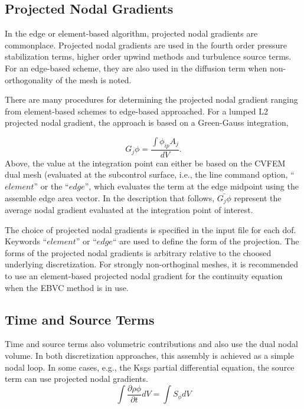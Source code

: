 \subsection{Projected Nodal Gradients}
In the edge or element-based algorithm, projected nodal gradients
are commonplace. Projected nodal gradients are used in the fourth 
order pressure stabilization terms, higher order upwind methods and
turbulence source terms. For an edge-based scheme, they are also used
in the diffusion term when non-orthogonality of the mesh is noted.

There are many procedures for determining the projected 
nodal gradient ranging from element-based schemes to
edge-based approached. For a lumped L2 projected nodal gradient,
the approach is based on a Green-Gauss integration,

\begin{equation}
G_j \phi = \frac{\int \phi_{ip} A_j}{dV}.
\label{greenGauss}
\end{equation}
Above, the value at the integration point can either be
based on the CVFEM dual mesh (evaluated at the subcontrol
surface, i.e., the line command option, ``$element$'' or the ``$edge$'', which 
evaluates the term at the edge midpoint using the assemble edge area vector. 
In the description that follows, $\bar{G_j \phi}$
represent the average nodal gradient evaluated at the integration
point of interest.

The choice of projected nodal gradients is specified in the input file for each dof.
Keywords ``$element$'' or ``$edge$`` are used to define the form of the projection. The
forms of the projected nodal gradients is arbitrary relative to the choosed underlying
discretization. For strongly non-orthoginal meshes, it is recommended to use an element-based
projected nodal gradient for the continuity equation when the EBVC method is in use.

\subsection{Time and Source Terms}
Time and source terms also volumetric contributions and also use the dual nodal volume. In both
discretization approaches, this assembly is achieved
as a simple nodal loop. In some cases, e.g., the Ksgs partial differential equation, the
source term can use projected nodal gradients.
\begin{equation}
  \int \frac{\partial \rho \phi }{\partial t} dV = \int S_{\phi}dV 
\end{equation}

